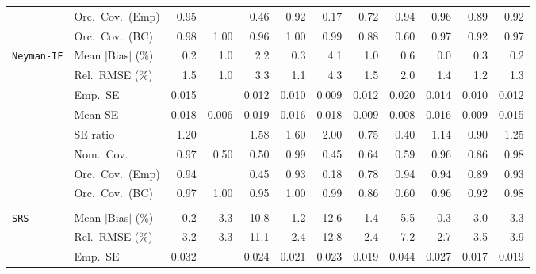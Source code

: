 \begin{landscape}
\begin{longtable}{llrrrrrrrrrr}
 & Orc.\ Cov.\ (Emp) & \cellcolor{rankone}0.95 &  & 0.46 & \cellcolor{rankthree}0.92 & 0.17 & 0.72 & \cellcolor{ranktwo}0.94 & \cellcolor{ranktwo}0.96 & 0.89 & \cellcolor{rankthree}0.92 \\
 & Orc.\ Cov.\ (BC) & \cellcolor{rankthree}0.98 & 1.00 & \cellcolor{rankone}0.96 & 1.00 & 0.99 & 0.88 & 0.60 & \cellcolor{ranktwo}0.97 & \cellcolor{rankthree}0.92 & \cellcolor{ranktwo}0.97 \\
\addlinespace[2pt]
\quad \texttt{Neyman-IF} & Mean $|$Bias$|$ (\%) & \cellcolor{ranktwo}0.2 & 1.0 & 2.2 & \cellcolor{rankthree}0.3 & 4.1 & 1.0 & 0.6 & \cellcolor{rankone}0.0 & \cellcolor{rankthree}0.3 & \cellcolor{ranktwo}0.2 \\
 & Rel.\ RMSE (\%) & 1.5 & \cellcolor{rankone}1.0 & 3.3 & \cellcolor{ranktwo}1.1 & 4.3 & 1.5 & 2.0 & 1.4 & \cellcolor{rankthree}1.2 & 1.3 \\
 & Emp.\ SE & 0.015 &  & 0.012 & 0.010 & 0.009 & 0.012 & 0.020 & 0.014 & 0.010 & 0.012 \\
 & Mean SE & 0.018 & 0.006 & 0.019 & 0.016 & 0.018 & 0.009 & 0.008 & 0.016 & 0.009 & 0.015 \\
 & SE ratio & \cellcolor{rankthree}1.20 &  & 1.58 & 1.60 & 2.00 & 0.75 & 0.40 & \cellcolor{ranktwo}1.14 & \cellcolor{rankone}0.90 & 1.25 \\
 & Nom.\ Cov. & \cellcolor{ranktwo}0.97 & 0.50 & 0.50 & 0.99 & 0.45 & 0.64 & 0.59 & \cellcolor{rankone}0.96 & 0.86 & \cellcolor{rankthree}0.98 \\
 & Orc.\ Cov.\ (Emp) & \cellcolor{rankone}0.94 &  & 0.45 & \cellcolor{ranktwo}0.93 & 0.18 & 0.78 & \cellcolor{rankone}0.94 & \cellcolor{rankone}0.94 & \cellcolor{rankthree}0.89 & \cellcolor{ranktwo}0.93 \\
 & Orc.\ Cov.\ (BC) & \cellcolor{rankthree}0.97 & 1.00 & \cellcolor{rankone}0.95 & 1.00 & 0.99 & 0.86 & 0.60 & \cellcolor{ranktwo}0.96 & 0.92 & 0.98 \\
\addlinespace[2pt]
\multicolumn{12}{l}{\textbf{Continuous Phase-One Covariates}} \\
\addlinespace[2pt]
\quad \texttt{SRS} & Mean $|$Bias$|$ (\%) & \cellcolor{rankone}0.2 & 3.3 & 10.8 & \cellcolor{rankthree}1.2 & 12.6 & 1.4 & 5.5 & \cellcolor{ranktwo}0.3 & 3.0 & 3.3 \\
 & Rel.\ RMSE (\%) & \cellcolor{rankthree}3.2 & 3.3 & 11.1 & \cellcolor{rankone}2.4 & 12.8 & \cellcolor{rankone}2.4 & 7.2 & \cellcolor{ranktwo}2.7 & 3.5 & 3.9 \\
 & Emp.\ SE & 0.032 &  & 0.024 & 0.021 & 0.023 & 0.019 & 0.044 & 0.027 & 0.017 & 0.019 \\

\end{longtable}
\end{landscape}
